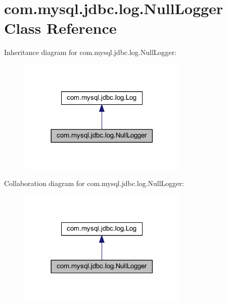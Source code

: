 \hypertarget{classcom_1_1mysql_1_1jdbc_1_1log_1_1_null_logger}{}\section{com.\+mysql.\+jdbc.\+log.\+Null\+Logger Class Reference}
\label{classcom_1_1mysql_1_1jdbc_1_1log_1_1_null_logger}


Inheritance diagram for com.\+mysql.\+jdbc.\+log.\+Null\+Logger\+:
\nopagebreak
\begin{figure}[H]
\begin{center}
\leavevmode
\includegraphics[width=230pt]{classcom_1_1mysql_1_1jdbc_1_1log_1_1_null_logger__inherit__graph}
\end{center}
\end{figure}


Collaboration diagram for com.\+mysql.\+jdbc.\+log.\+Null\+Logger\+:
\nopagebreak
\begin{figure}[H]
\begin{center}
\leavevmode
\includegraphics[width=230pt]{classcom_1_1mysql_1_1jdbc_1_1log_1_1_null_logger__coll__graph}
\end{center}
\end{figure}
